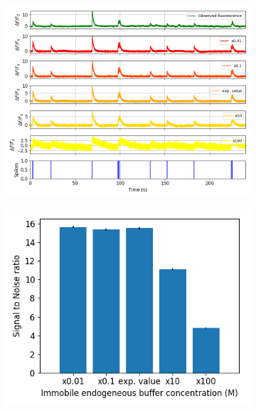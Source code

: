 \documentclass[a4paper,12pt]{article}
\theoremstyle{definition}
\begin{document}
\begin{figure}
    \begin{subfigure}{\textwidth}
        \includegraphics[width=\linewidth]{figures/immobile_perturbed_fluorescence_18_paper.png}
        \caption{}
    \end{subfigure}
    \begin{subfigure}{0.5\textwidth}
        \includegraphics[width=\linewidth]{figures/immobile_perturbed_snr.png}
        \caption{}
    \end{subfigure}
    \begin{subfigure}{0.5\textwidth}

\end{subfigure}
\end{figure}
\end{document}
